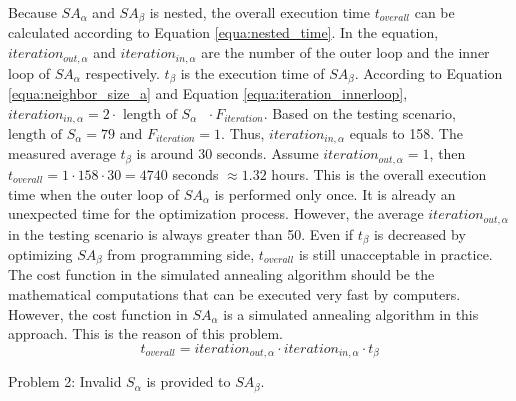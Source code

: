		Because $SA_{\alpha}$ and $SA_{\beta}$ is nested, the overall execution time
		$t_{overall}$ can be calculated according to Equation \ref{equa:nested_time}.
		In the equation, $iteration_{out,\alpha}$ and $iteration_{in,\alpha}$ are the
		number of the outer loop and the inner loop of $SA_{\alpha}$ respectively.
		$t_{\beta}$ is the execution time of $SA_{\beta}$.
		According to Equation \ref{equa:neighbor_size_a} and Equation
		\ref{equa:iteration_innerloop},
		$iteration_{in,\alpha} = 2 \cdot \text{ length of $S_{\alpha}$ } \cdot F_{iteration}$.
		Based on the testing scenario, $\text{length of $S_{\alpha}$}=79$ and $F_{iteration}=1$.
		Thus, $iteration_{in,\alpha}$ equals to 158.
		The measured average $t_{\beta}$ is around 30 seconds.
		Assume $iteration_{out,\alpha}=1$, then
		$t_{overall}=1 \cdot 158 \cdot 30=4740$ seconds $\approx 1.32$ hours.
		This is the overall execution time when the outer loop of $SA_{\alpha}$ is
		performed only once. It is already an unexpected time for the optimization
		process.
		However, the average $iteration_{out,\alpha}$ in the testing scenario is always
		greater than 50.
		Even if $t_{\beta}$ is decreased by optimizing $SA_{\beta}$ from programming
		side, $t_{overall}$ is still unacceptable in practice.
		The cost function in the simulated annealing algorithm should be the mathematical computations that can be executed very fast by computers.
		However, the cost function in $SA_{\alpha}$ is a simulated annealing algorithm
		in this approach. This is the reason of this problem.
		\begin{equation}
		\label{equa:nested_time}
			t_{overall}=iteration_{out,\alpha} \cdot iteration_{in,\alpha} \cdot t_{\beta}
		\end{equation}
		
		Problem 2: Invalid $S_{\alpha}$ is provided to $SA_{\beta}$.
		
